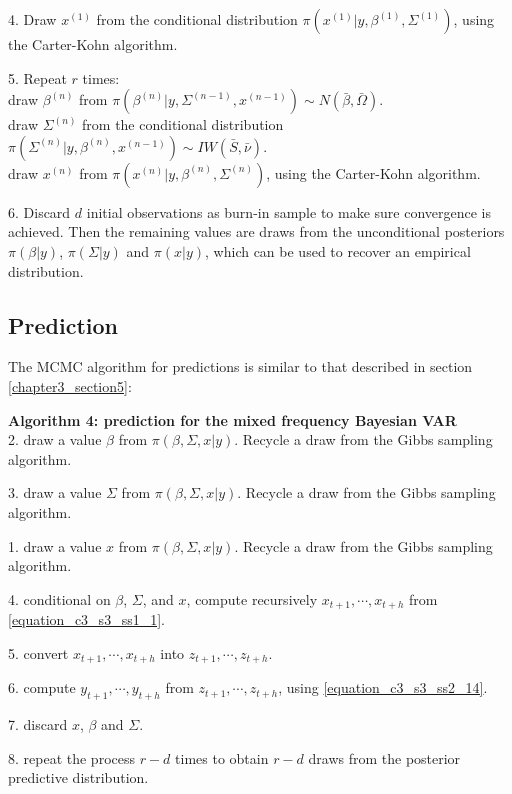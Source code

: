 4. Draw $x^{(1)}$ from the conditional distribution $\pi(x^{(1)}| y, \beta^{(1)}, \Sigma^{(1)})$, using the  Carter-Kohn algorithm.

5. Repeat $r$ times: \\
draw $\beta^{(n)}$ from $\pi(\beta^{(n)}| y, \Sigma^{(n-1)}, x^{(n-1)}) \sim N(\bar{\beta}, \bar{\Omega})$. \\
draw $\Sigma^{(n)}$ from the conditional distribution $\pi(\Sigma^{(n)}| y, \beta^{(n)}, x^{(n-1)}) \sim IW(\bar{S}, \bar{\nu})$. \\
draw $x^{(n)}$ from $\pi(x^{(n)}| y, \beta^{(n)}, \Sigma^{(n)})$, using the Carter-Kohn algorithm.

6. Discard $d$ initial observations as burn-in sample to make sure convergence is achieved. Then the remaining values are draws from the unconditional posteriors $\pi(\beta| y)$, $\pi(\Sigma| y)$ and $\pi(x| y)$, which can be used to recover an empirical distribution.

\newpage

\subsection{Prediction}
\label{chapter3_section3_subsection3}


The MCMC algorithm for predictions is similar to that described in section \ref{chapter3_section5}:

\textbf{Algorithm 4: prediction for the mixed frequency Bayesian VAR} \vspace{3mm} \\
2. draw a value $\beta$ from $\pi(\beta, \Sigma, x|y)$. Recycle a draw from the Gibbs sampling algorithm.

3. draw a value $\Sigma$ from $\pi(\beta, \Sigma, x|y)$. Recycle a draw from the Gibbs sampling algorithm.

1. draw a value $x$ from $\pi(\beta, \Sigma, x|y)$. Recycle a draw from the Gibbs sampling algorithm.

4. conditional on $\beta$, $\Sigma$, and $x$, compute recursively $x_{t+1}, \cdots, x_{t+h}$ from \ref{equation_c3_s3_ss1_1}.

5. convert $x_{t+1}, \cdots, x_{t+h}$ into $z_{t+1}, \cdots, z_{t+h}$.

6. compute $y_{t+1}, \cdots, y_{t+h}$ from $z_{t+1}, \cdots, z_{t+h}$, using \ref{equation_c3_s3_ss2_14}.

7. discard $x$, $\beta$ and $\Sigma$.

8. repeat the process $r-d$ times to obtain $r-d$ draws from the posterior predictive distribution.



